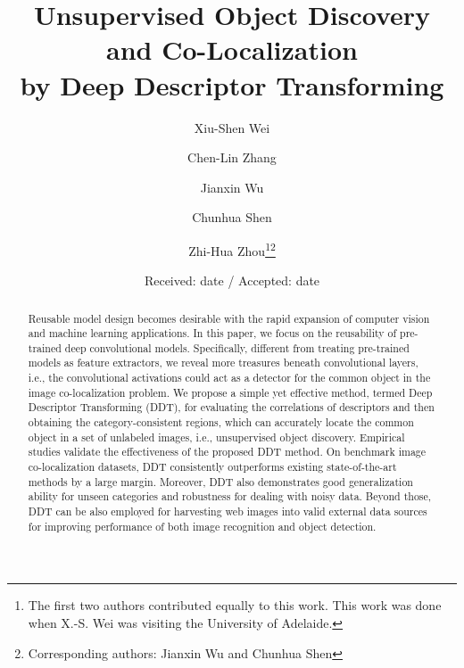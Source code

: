 \documentclass[twocolumn]{svjour3}          \smartqed  \usepackage{graphicx}
\begin{document}
\title{Unsupervised Object Discovery and Co-Localization\\by Deep Descriptor Transforming}


\author{Xiu-Shen Wei \and Chen-Lin Zhang \and Jianxin Wu \and Chunhua Shen \and Zhi-Hua Zhou\thanks{The first two authors contributed equally to this work. This work was done when X.-S. Wei was visiting the University of Adelaide.}\thanks{Corresponding authors: Jianxin Wu and Chunhua Shen}
}



\date{Received: date / Accepted: date}

\maketitle

\begin{abstract}
Reusable model design becomes desirable with the rapid expansion of computer vision and machine learning applications. In this paper, we focus on the reusability of pre-trained deep convolutional models. Specifically, different from treating pre-trained models as feature extractors, we reveal more treasures beneath convolutional layers, i.e., the convolutional activations could act as a detector for the common object in the image co-localization problem. We propose a simple yet effective method, termed Deep Descriptor Transforming (DDT), for evaluating the correlations of descriptors and then obtaining the category-consistent regions, which can accurately locate the common object in a set of unlabeled images, i.e., unsupervised object discovery. Empirical studies validate the effectiveness of the proposed DDT method. On benchmark image co-localization datasets, DDT consistently outperforms existing state-of-the-art methods by a large margin. Moreover, DDT also demonstrates good generalization ability for unseen categories and robustness for dealing with noisy data. Beyond those, DDT can be also employed for harvesting web images into valid external data sources for improving performance of both image recognition and object detection.
\end{abstract}
\end{document}
